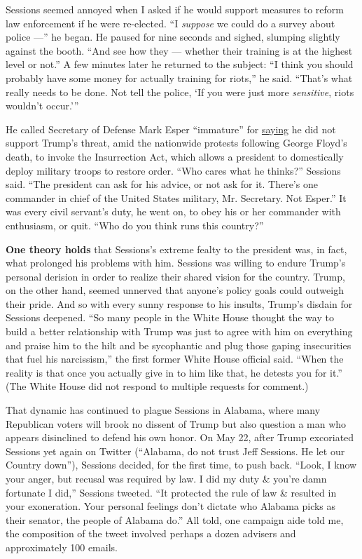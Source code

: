 Sessions seemed annoyed when I asked if he would support measures to
reform law enforcement if he were re-elected. ``I \emph{suppose} we
could do a survey about police ---'' he began. He paused for nine
seconds and sighed, slumping slightly against the booth. ``And see how
they --- whether their training is at the highest level or not.'' A few
minutes later he returned to the subject: ``I think you should probably
have some money for actually training for riots,'' he said. ``That's
what really needs to be done. Not tell the police, `If you were just
more \emph{sensitive}, riots wouldn't occur.'''

He called Secretary of Defense Mark Esper ``immature'' for
\href{https://www.nytimes3xbfgragh.onion/2020/06/03/us/politics/esper-milley-trump-protest.html}{saying}
he did not support Trump's threat, amid the nationwide protests
following George Floyd's death, to invoke the Insurrection Act, which
allows a president to domestically deploy military troops to restore
order. ``Who cares what he thinks?'' Sessions said. ``The president can
ask for his advice, or not ask for it. There's one commander in chief of
the United States military, Mr. Secretary. Not Esper.'' It was every
civil servant's duty, he went on, to obey his or her commander with
enthusiasm, or quit. ``Who do you think runs this country?''

\textbf{One theory holds} that Sessions's extreme fealty to the
president was, in fact, what prolonged his problems with him. Sessions
was willing to endure Trump's personal derision in order to realize
their shared vision for the country. Trump, on the other hand, seemed
unnerved that anyone's policy goals could outweigh their pride. And so
with every sunny response to his insults, Trump's disdain for Sessions
deepened. ``So many people in the White House thought the way to build a
better relationship with Trump was just to agree with him on everything
and praise him to the hilt and be sycophantic and plug those gaping
insecurities that fuel his narcissism,'' the first former White House
official said. ``When the reality is that once you actually give in to
him like that, he detests you for it.'' (The White House did not respond
to multiple requests for comment.)

That dynamic has continued to plague Sessions in Alabama, where many
Republican voters will brook no dissent of Trump but also question a man
who appears disinclined to defend his own honor. On May 22, after Trump
excoriated Sessions yet again on Twitter (``Alabama, do not trust Jeff
Sessions. He let our Country down''), Sessions decided, for the first
time, to push back. ``Look, I know your anger, but recusal was required
by law. I did my duty \& you're damn fortunate I did,'' Sessions
tweeted. ``It protected the rule of law \& resulted in your exoneration.
Your personal feelings don't dictate who Alabama picks as their senator,
the people of Alabama do.'' All told, one campaign aide told me, the
composition of the tweet involved perhaps a dozen advisers and
approximately 100 emails.

